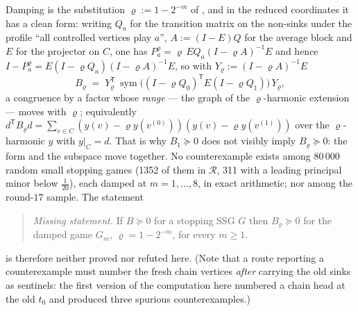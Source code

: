 \begin{remark}\label{hz:damping}
Damping is the substitution $\varrho:=1-2^{-m}$ of , and
in the reduced coordinates it has a clean form: writing $Q_a$ for the
transition matrix on the non-sinks under the profile ``all controlled vertices
play $a$'', $A:=(I-E)Q$ for the average block and $E$ for the projector on $C$,
one has $P_a^{\varrho}=\varrho\,EQ_a(I-\varrho A)^{-1}E$ and hence
$I-P_a^{\varrho}=E(I-\varrho Q_a)(I-\varrho A)^{-1}E$, so with
$Y_\varrho:=(I-\varrho A)^{-1}E$
\[
  B_\varrho\;=\;Y_\varrho^{\mathsf T}\,
  \operatorname{sym}\bigl((I-\varrho Q_0)^{\mathsf T}E(I-\varrho Q_1)\bigr)\,Y_\varrho ,
\]
a congruence by a factor whose \emph{range} --- the graph of the
$\varrho$-harmonic extension --- moves with $\varrho$; equivalently
$d^{\mathsf T}B_\varrho d=\sum_{v\in C}(y(v)-\varrho y(v^{(0)}))(y(v)-\varrho y(v^{(1)}))$
over the $\varrho$-harmonic $y$ with $y|_C=d$. That is why $B_1\succeq0$ does
not visibly imply $B_\varrho\succeq0$: the form and the subspace move together.
No counterexample exists among $80\,000$ random small stopping games
(1352 of them in $\mathcal R$, 311 with a leading principal minor below
$\tfrac1{20}$), each damped at $m=1,\dots,8$, in exact arithmetic; nor among
the round-$17$ sample. The statement
\begin{quote}
\emph{Missing statement.} If $B\succeq0$ for a stopping SSG $G$ then
$B_\varrho\succeq0$ for the damped game $G_m$, $\varrho=1-2^{-m}$, for every
$m\ge1$.
\end{quote}
is therefore neither proved nor refuted here. (Note that a route reporting a
counterexample must number the fresh chain vertices \emph{after} carrying the
old sinks as sentinels: the first version of the computation here numbered a
chain head at the old $t_0$ and produced three spurious counterexamples.)
\end{remark}